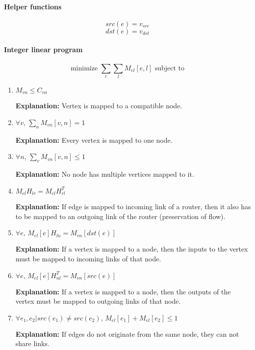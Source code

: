 \paragraph{Helper functions}
\begin{equation*}
src(e) = v_{src}
\end{equation*}
\begin{equation*}
dst(e) = v_{dst}
\end{equation*}

\paragraph{Integer linear program}

\begin{equation*}
\text{minimize }\sum_e \sum_l M_{el}[e,l] \text{ subject to}
\end{equation*}

\begin{enumerate}
\item $M_{vn} \le C_{vn}$

\textbf{Explanation:} Vertex is mapped to a compatible node.
\item $\forall v, \, \sum\limits_n M_{vn}[v,n] = 1$

\textbf{Explanation:} Every vertex is mapped to one node.
\item $\forall n, \, \sum\limits_v M_{vn}[v,n] \le 1$

\textbf{Explanation:} No node has multiple vertices mapped to it.
\item $M_{el} H_{lr} = M_{el} H_{rl}^T$

\textbf{Explanation:} If edge is mapped to incoming link of a router, then it also has to be mapped to an outgoing link of the router (preservation of flow).
\item $\forall e, \, M_{el}[e]H_{ln} = M_{vn}[dst(e)]$ 

\textbf{Explanation:} If a vertex is mapped to a node, then the inputs to the vertex must be mapped to incoming links of that node.
\item $\forall e, \, M_{el}[e]H_{nl}^T = M_{vn}[src(e)]$

\textbf{Explanation:} If a vertex is mapped to a node, then the outputs of the vertex must be mapped to outgoing links of that node.
\item $\forall e_1, e_2 | src(e_1) \ne src(e_2), \, M_{el}[e_1] + M_{el}[e_2] \le 1$

\textbf{Explanation:} If edges do not originate from the same node, they can not share links.
\end{enumerate}

